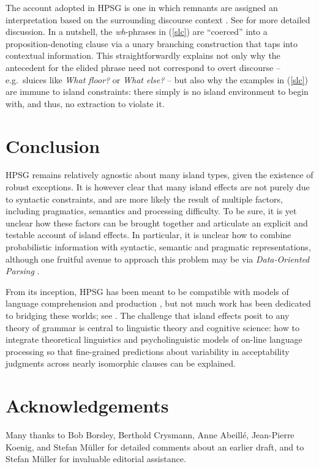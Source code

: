 \documentclass[output=paper
 	        ,biblatex
                ,babelshorthands
                ,newtxmath
                ,draftmode
                ,colorlinks, citecolor=brown
]{langscibook}
\begin{document}
The  account adopted in HPSG is one in which remnants  are assigned an interpretation based on the surrounding discourse context  \citep{ginzsag,Culicover:Jackendoff:05,jacobson08,sagn}. 
See  for more detailed discussion. In a nutshell,  the \emph{wh}-phrases in (\ref{slc}) are ``coerced'' into a proposition-denoting clause via a unary branching construction that taps into contextual information.  This straightforwardly explains not only why the antecedent for the elided phrase need not correspond to  overt discourse --  e.g.\ sluices like \emph{What floor?} or \emph{What else?} --
but also  why the examples in (\ref{slc})  are immune to island constraints: there simply is no island
 environment to begin with, and thus, no extraction to violate it.



\section{Conclusion}

HPSG remains relatively agnostic about many island types, given the existence of robust exceptions.
It is however clear that many island effects are not purely due to syntactic constraints, and are more likely
the result of multiple factors, including pragmatics, semantics and processing difficulty.
To be sure, it is yet unclear how these factors can be brought together and articulate an explicit
and testable account of island effects. In particular, it is unclear how to combine probabilistic information with syntactic, semantic and pragmatic representations, although one fruitful avenue to approach  this problem may be via  \emph{Data-Oriented Parsing} \citep{NF2002a-u,NF99a,Arnold:Linardaki:07,BSS2003a-ed,Bod2009a}.  


From its inception, HPSG has been meant to be compatible with models of language comprehension and production \citep{sagser,Sag:Wasow:ta,Sag:Wasow:ta2}, but not much work has been dedicated to bridging these worlds; see . The challenge that island effects posit to any theory of grammar is central to linguistic theory and cognitive science: how to integrate theoretical linguistics and psycholinguistic models of on-line language processing so that fine-grained predictions about variability in acceptability judgments across nearly isomorphic clauses can be explained.


 
\section*{Acknowledgements}

Many thanks to Bob Borsley, Berthold Crysmann, Anne Abeillé, 
Jean-Pierre Koenig, and Stefan Müller for
detailed comments about an earlier draft, and to Stefan Müller for
invaluable editorial assistance.

{\sloppy
\printbibliography[heading=subbibliography,notkeyword=this] 
}
\end{document}
